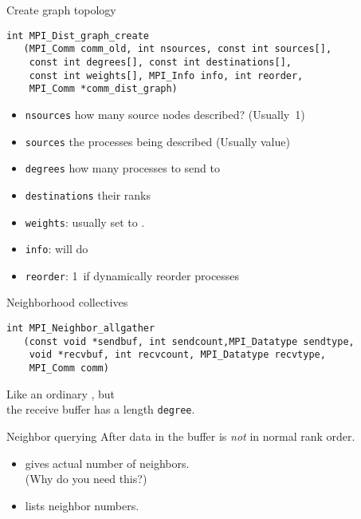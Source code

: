 \begin{numberedframe}{Create graph topology}
\lstset{language=C}
\begin{lstlisting}
int MPI_Dist_graph_create
   (MPI_Comm comm_old, int nsources, const int sources[],
    const int degrees[], const int destinations[], 
    const int weights[], MPI_Info info, int reorder,
    MPI_Comm *comm_dist_graph)
\end{lstlisting}
\begin{itemize}
\item \lstinline{nsources} how many source nodes described? (Usually~1)
\item \lstinline{sources} the processes being described (Usually
   value)
\item \lstinline{degrees} how many processes to send to
\item \lstinline{destinations} their ranks
\item \lstinline{weights}: usually set to .
\item \lstinline{info}:  will do
\item \lstinline{reorder}: 1~if dynamically reorder processes
\end{itemize}
\end{numberedframe}

\begin{numberedframe}{Neighborhood collectives}
\begin{lstlisting}
int MPI_Neighbor_allgather
   (const void *sendbuf, int sendcount,MPI_Datatype sendtype,
    void *recvbuf, int recvcount, MPI_Datatype recvtype,
    MPI_Comm comm)
\end{lstlisting}
Like an ordinary , but\\
the receive buffer has a length \lstinline{degree}.
\end{numberedframe}

\begin{numberedframe}{Neighbor querying}
  \label{sl:graph-neighbors}
  After  data in the buffer
  is \emph{not} in normal rank order.
  \begin{itemize}
  \item {} gives actual number of neighbors.\\
    (Why do you need this?)
  \item 
     lists neighbor numbers.
  \end{itemize}
\end{numberedframe}

